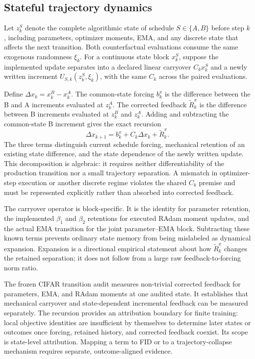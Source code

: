 \subsection{Stateful trajectory dynamics}
\label{sec:stateful-trajectory-dynamics}

Let $z_k^S$ denote the complete algorithmic state of schedule
$S\in\{A,B\}$ before step $k$, including parameters, optimizer moments, EMA,
and any discrete state that affects the next transition.  Both counterfactual
evaluations consume the same exogenous randomness $\xi_k$.  For a continuous
state block $x_k^S$, suppose the implemented update separates into a declared
linear carryover $C_k x_k^S$ and a newly written increment
$U_{S,k}(z_k^S,\xi_k)$, with the same $C_k$ across the paired evaluations.

Define $\Delta x_k=x_k^B-x_k^A$.  The common-state forcing $b_k^x$ is the
difference between the B and A increments evaluated at $z_k^A$.  The corrected
feedback $\widetilde R_k^x$ is the difference between B increments evaluated
at $z_k^B$ and $z_k^A$.  Adding and subtracting the common-state B increment
gives the exact recursion
\begin{equation}
  \boxed{
  \Delta x_{k+1}
  =b_k^x+C_k\Delta x_k+\widetilde R_k^x.
  }
  \label{eq:carryover-corrected-recursion}
\end{equation}
The three terms distinguish current schedule forcing, mechanical retention of
an existing state difference, and the state dependence of the newly written
update.  This decomposition is algebraic: it requires neither differentiability
of the production transition nor a small trajectory separation.  A mismatch
in optimizer-step execution or another discrete regime violates the shared
$C_k$ premise and must be represented explicitly rather than absorbed into
corrected feedback.

The carryover operator is block-specific.  It is the identity for parameter
retention, the implemented $\beta_1$ and $\beta_2$ retentions for executed
RAdam moment updates, and the actual EMA transition for the joint
parameter--EMA block.  Subtracting these known terms prevents ordinary state
memory from being mislabeled as dynamical expansion.  Expansion is a
directional empirical statement about how $\widetilde R_k^x$ changes the
retained separation; it does not follow from a large raw feedback-to-forcing
norm ratio.

The frozen CIFAR transition audit measures non-trivial corrected feedback for
parameters, EMA, and RAdam moments at one audited state.  It establishes that
mechanical carryover and state-dependent incremental feedback can be measured
separately.  The recursion provides an attribution boundary for finite
training: local objective identities are insufficient by themselves to
determine later states or outcomes once forcing, retained history, and
corrected feedback coexist.  Its scope is state-level attribution.  Mapping a
term to FID or to a trajectory-collapse mechanism requires separate,
outcome-aligned evidence.
